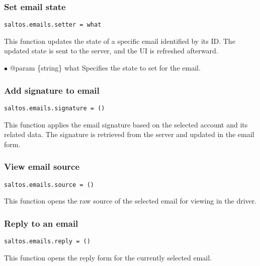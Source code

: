 \documentclass[a4paper]{article}
\begin{document}
\hypertarget{toc74}{}
\subsubsection{Set email state}

\begin{lstlisting}
saltos.emails.setter = what
\end{lstlisting}

This function updates the state of a specific email identified by its ID. The updated state is sent
to the server, and the UI is refreshed afterward.

\begin{compactitem}
\item[\color{myblue}$\bullet$] @param \{string\} what Specifies the state to set for the email.
\end{compactitem}

\hypertarget{toc75}{}
\subsubsection{Add signature to email}

\begin{lstlisting}
saltos.emails.signature = ()
\end{lstlisting}

This function applies the email signature based on the selected account and its related data.
The signature is retrieved from the server and updated in the email form.

\hypertarget{toc76}{}
\subsubsection{View email source}

\begin{lstlisting}
saltos.emails.source = ()
\end{lstlisting}

This function opens the raw source of the selected email for viewing in the driver.

\hypertarget{toc77}{}
\subsubsection{Reply to an email}

\begin{lstlisting}
saltos.emails.reply = ()
\end{lstlisting}

This function opens the reply form for the currently selected email.
\end{document}
